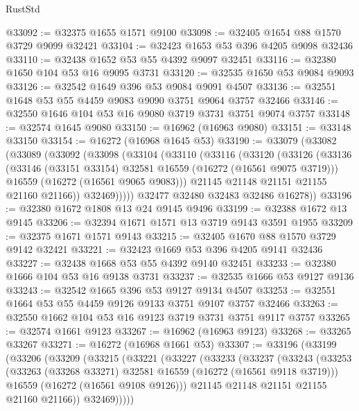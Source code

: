 \begin{lexlean}{RustStd}
\begin{coremodule}
@33092 := @32375 @1655 @1571 @9100
@33098 := @32405 @1654 @88 @1570 @3729 @9099 @32421
@33104 := @32423 @1653 @53 @396 @4205 @9098 @32436
@33110 := @32438 @1652 @53 @55 @4392 @9097 @32451
@33116 := @32380 @1650 @104 @53 @16 @9095 @3731
@33120 := @32535 @1650 @53 @9084 @9093
@33126 := @32542 @1649 @396 @53 @9084 @9091 @4507
@33136 := @32551 @1648 @53 @55 @4459 @9083 @9090 @3751 @9064 @3757 @32466
@33146 := @32550 @1646 @104 @53 @16 @9080 @3719 @3731 @3751 @9074 @3757
@33148 := @32574 @1645 @9080
@33150 := @16962 (@16963 @9080)
@33151 := @33148 @33150
@33154 := @16272 (@16968 @1645 @53)
@33190 := @33079
    (@33082
      (@33089
        (@33092
          (@33098
            (@33104
              (@33110
                (@33116
                  (@33120
                    (@33126
                      (@33136
                        (@33146 (@33151 @33154) @32581 @16559 (@16272 (@16561 @9075 @3719)))
                        @16559
                        (@16272 (@16561 @9065 @9083)))
                      @21145
                      @21148
                      @21151
                      @21155
                      @21160
                      @21166))
                  @32469)))))
        @32477
        @32480
        @32483
        @32486
        @16278))
@33196 := @32380 @1672 @1808 @13 @24 @9145 @9496
@33199 := @32388 @1672 @13 @9145
@33206 := @32394 @1671 @1571 @13 @3719 @9143 @3591 @1955
@33209 := @32375 @1671 @1571 @9143
@33215 := @32405 @1670 @88 @1570 @3729 @9142 @32421
@33221 := @32423 @1669 @53 @396 @4205 @9141 @32436
@33227 := @32438 @1668 @53 @55 @4392 @9140 @32451
@33233 := @32380 @1666 @104 @53 @16 @9138 @3731
@33237 := @32535 @1666 @53 @9127 @9136
@33243 := @32542 @1665 @396 @53 @9127 @9134 @4507
@33253 := @32551 @1664 @53 @55 @4459 @9126 @9133 @3751 @9107 @3757 @32466
@33263 := @32550 @1662 @104 @53 @16 @9123 @3719 @3731 @3751 @9117 @3757
@33265 := @32574 @1661 @9123
@33267 := @16962 (@16963 @9123)
@33268 := @33265 @33267
@33271 := @16272 (@16968 @1661 @53)
@33307 := @33196
    (@33199
      (@33206
        (@33209
          (@33215
            (@33221
              (@33227
                (@33233
                  (@33237
                    (@33243
                      (@33253
                        (@33263 (@33268 @33271) @32581 @16559 (@16272 (@16561 @9118 @3719)))
                        @16559
                        (@16272 (@16561 @9108 @9126)))
                      @21145
                      @21148
                      @21151
                      @21155
                      @21160
                      @21166))
                  @32469)))))

\end{coremodule}
\end{lexlean}
